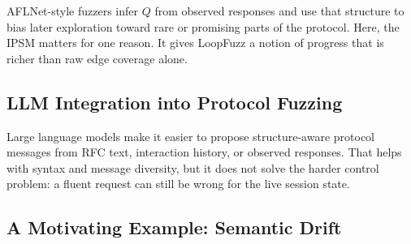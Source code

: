 \documentclass[final,5p,times,number]{elsarticle}
\begin{document}
AFLNet-style fuzzers infer $Q$ from observed responses and use that structure to bias later exploration toward rare or promising parts of the protocol. Here, the IPSM matters for one reason. It gives LoopFuzz a notion of progress that is richer than raw edge coverage alone.

\subsection{LLM Integration into Protocol Fuzzing}
Large language models make it easier to propose structure-aware protocol messages from RFC text, interaction history, or observed responses. That helps with syntax and message diversity, but it does not solve the harder control problem: a fluent request can still be wrong for the live session state.

\subsection{A Motivating Example: Semantic Drift}
\end{document}
